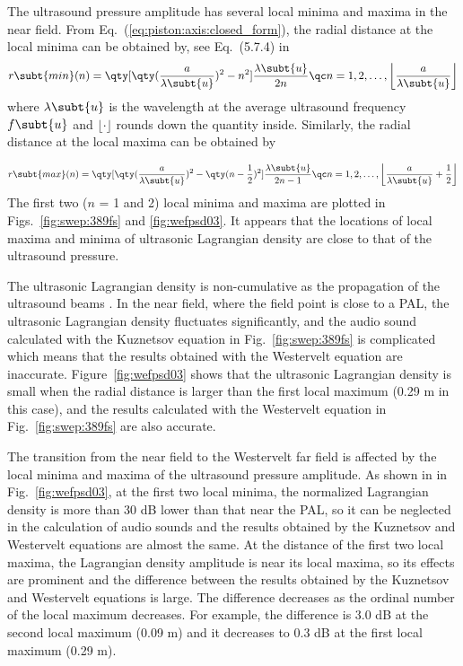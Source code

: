 The ultrasound pressure amplitude has several local minima and maxima in the near field. From Eq.~(\ref{eq:piston:axis:closed_form}), the radial distance at the local minima can be obtained by, see Eq.~(5.7.4) in~\cite{Pierce2019AcousticsIntroductionIts}
\begin{equation}
    r\subt{min}(n)
    = 
    \qty[\qty(\frac{a}{\lambda\subt{u}})^2 - n^2]
    \frac{\lambda\subt{u}}{2n}
    \qc
    n =
    1,2, \ldots,
    \left\lfloor \frac{a}{\lambda\subt{u}} \right\rfloor
    \label{eq:swe_rmin}
\end{equation}
where $\lambda\subt{u}$ is the wavelength at the average ultrasound frequency $f\subt{u}$ and $\lfloor \cdot \rfloor$ rounds down the quantity inside. Similarly, the radial distance at the local maxima can be obtained by

\begin{equation}
    r\subt{max}(n)
    =
    \qty[\qty(\frac{a}{\lambda\subt{u}})^2 - 
    \qty(n-\frac{1}{2})^2]
    \frac{\lambda\subt{u}}{2n-1}
    \qc
    n=1,2,\ldots,
    \left\lfloor
        \frac{a}{\lambda\subt{u}}+\frac{1}{2}
    \right\rfloor
    \label{eq:swe:rmax}
\end{equation}
The first two ($n$ = 1 and 2) local minima and maxima are plotted in Figs.~\ref{fig:swep:389fs} and \ref{fig:wefpsd03}. 
It appears that the locations of local maxima and minima of ultrasonic Lagrangian density are close to that of the ultrasound pressure.

The ultrasonic Lagrangian density is non-cumulative as the propagation of the ultrasound beams \cite{Aanonsen1984DistortionHarmonicGeneration}.
In the near field, where the field point is close to a PAL, the ultrasonic Lagrangian density fluctuates significantly, and the audio sound calculated with the Kuznetsov equation in Fig.~\ref{fig:swep:389fs} is complicated which means that the results obtained with the Westervelt equation are inaccurate. 
Figure~\ref{fig:wefpsd03} shows that the ultrasonic Lagrangian density is small when the radial distance is larger than the first local maximum (0.29 m in this case), and the results calculated with the Westervelt equation in Fig.~\ref{fig:swep:389fs} are also accurate.

The transition from the near field to the Westervelt far field is affected by the local minima and maxima of the ultrasound pressure amplitude. 
As shown in in Fig.~\ref{fig:wefpsd03}, at the first two local minima, the normalized Lagrangian density is more than 30 dB lower than that near the PAL, so it can be neglected in the calculation of audio sounds and the results obtained by the Kuznetsov and Westervelt equations are almost the same.
At the distance of the first two local maxima, the Lagrangian density amplitude is near its local maxima, 
so its effects are prominent and the difference between the results obtained by the Kuznetsov and Westervelt equations is large. 
The difference decreases as the ordinal number of the local maximum decreases. 
For example, the difference is 3.0 dB at the second local maximum (0.09 m) and it decreases to 0.3 dB at the first local maximum (0.29 m).

